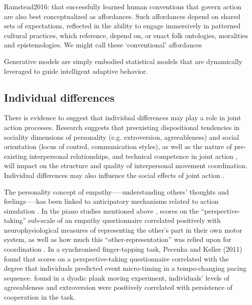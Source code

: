\begin{CJK}{UTF8}{gbsn}
Ramstead2016:
 that successfully learned human conventions that govern action are also best conceptualized as affordances. Such affordances depend on shared sets of expectations, reflected in the ability to engage immersively in patterned cultural practices, which reference, depend on, or enact folk ontologies, moralities and epistemologies. We might call these ‘conventional’ affordances


Generative models are simply embodied statistical models that are dynamically leveraged to guide intelligent adaptive behavior.









\subsection{Individual differences}

There is evidence to suggest that individual differences may play a role in joint action processes.  Research suggests that preexisting dispositional tendencies in sociality dimensions of personality (e.g. extroversion, agreeableness) and social orientation (locus of control, communication styles), as well as the nature of pre-existing interpersonal relationships, and technical competence in joint action \citep{Novembre2014}, will impact on the structure and quality of interpersonal movement coordination.  Individual differences may also influence the social effects of joint action \citep{Marsh2009}.

The personality concept of empathy—--understanding others’ thoughts and feelings—--has been linked to anticipatory mechanisms related to action simulation \citep{Sevdalis2014,Keller2014}.  In the piano studies mentioned above \citep{Novembre2012}, scores on the ``perspective-taking'' sub-scale of an empathy questionnaire correlated positively with neurophysiological measures of representing the other’s part in their own motor system, as well as how much this ``other-representation'' was relied upon for coordination \citep{Novembre2014a}.  In a synchronised finger-tapping task, Pecenka and Keller (2011) found that scores on a perspective-taking questionnaire correlated with the degree that individuals predicted event micro-timing in a tempo-changing pacing sequence.  \textcite{Richardson2007} found in a dyadic plank moving experiment, individuals’ levels of agreeableness and extroversion were positively correlated with persistence of cooperation in the task.


\end{CJK}
